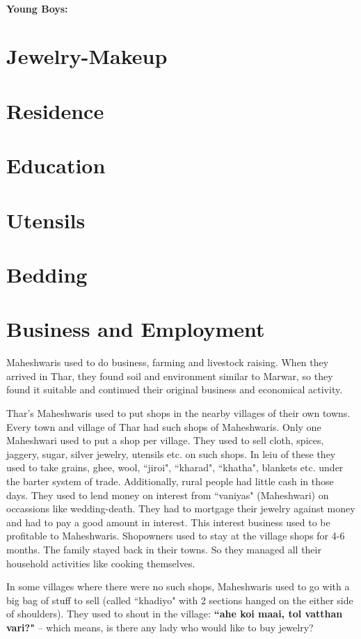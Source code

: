 \paragraph{Young Boys:} 
\section{Jewelry-Makeup}
\section{Residence}
\section{Education}
\section{Utensils}
\section{Bedding}
\section{Business and Employment}
Maheshwaris used to do business, farming and livestock raising. When they arrived in Thar, they found soil and environment similar to Marwar, so they found it suitable and continued their original business and economical activity.

Thar's Maheshwaris used to put shops in the nearby villages of their own towns. Every town and village of Thar had such shops of Maheshwaris. Only one Maheshwari used to put a shop per village. They used to sell cloth, spices, jaggery, sugar, silver jewelry, utensils etc. on such shops. In leiu of these they used to take grains, ghee, wool, ``jiroi", ``kharad", ``khatha", blankets etc. under the barter system of trade. Additionally, rural people had little cash in those days. They used to lend money on interest from ``vaniyas" (Maheshwari) on occassions like wedding-death. They had to mortgage their jewelry against money and had to pay a good amount in interest. This interest business used to be profitable to Maheshwaris. Shopowners used to stay at the village shops for 4-6 months. The family stayed back in their towns. So they managed all their household activities like cooking themselves.

In some villages where there were no such shops, Maheshwaris used to go with a big bag of stuff to sell (called ``khadiyo" with 2 sections hanged on the either side of shoulders). They used to shout in the village: \textbf{``ahe koi maai, tol vatthan vari?"} -- which means, is there any lady who would like to buy jewelry?

